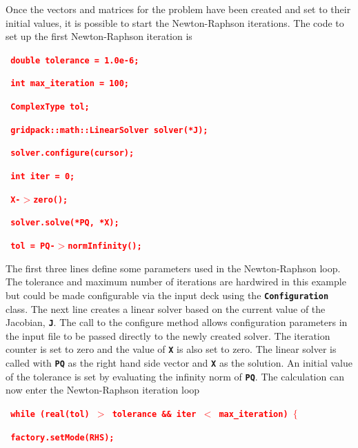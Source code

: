 \documentclass[12pt]{report} %
\begin{document}
Once the vectors and matrices for the problem have been created and set to their initial values, it is possible to start the Newton-Raphson iterations. The code to set up the first Newton-Raphson iteration is

\textcolor{red}{\texttt{\textbf{  double tolerance = 1.0e-6;}}}

\textcolor{red}{\texttt{\textbf{  int max\_iteration = 100;}}}

\textcolor{red}{\texttt{\textbf{  ComplexType tol;}}}

\textcolor{red}{\texttt{\textbf{}}}

\textcolor{red}{\texttt{\textbf{  gridpack::math::LinearSolver solver(*J);}}}

\textcolor{red}{\texttt{\textbf{  solver.configure(cursor);}}}

\textcolor{red}{\texttt{\textbf{}}}

\textcolor{red}{\texttt{\textbf{  int iter = 0;}}}

\textcolor{red}{\texttt{\textbf{}}}

\textcolor{red}{\texttt{\textbf{  X-$\boldsymbol{\mathrm{>}}$zero(); }}}

\textcolor{red}{\texttt{\textbf{  solver.solve(*PQ, *X);}}}

\textcolor{red}{\texttt{\textbf{  tol = PQ-$\boldsymbol{\mathrm{>}}$normInfinity();}}}

The first three lines define some parameters used in the Newton-Raphson loop. The tolerance and maximum number of iterations are hardwired in this example but could be made configurable via the input deck using the \texttt{\textbf{Configuration}} class. The next line creates a linear solver based on the current value of the Jacobian, \texttt{\textbf{J}}. The call to the configure method allows configuration parameters in the input file to be passed directly to the newly created solver. The iteration counter is set to zero and the value of \texttt{\textbf{X}} is also set to zero. The linear solver is called with \texttt{\textbf{PQ}} as the right hand side vector and \texttt{\textbf{X}} as the solution. An initial value of the tolerance is set by evaluating the infinity norm of \texttt{\textbf{PQ}}. The calculation can now enter the Newton-Raphson iteration loop

\textcolor{red}{\texttt{\textbf{  while (real(tol) $\boldsymbol{\mathrm{>}}$ tolerance \&\& iter $\boldsymbol{\mathrm{<}}$ max\_iteration) $\boldsymbol{\mathrm{\{}}$}}}

\textcolor{red}{\texttt{\textbf{    factory.setMode(RHS);}}}
\end{document}
